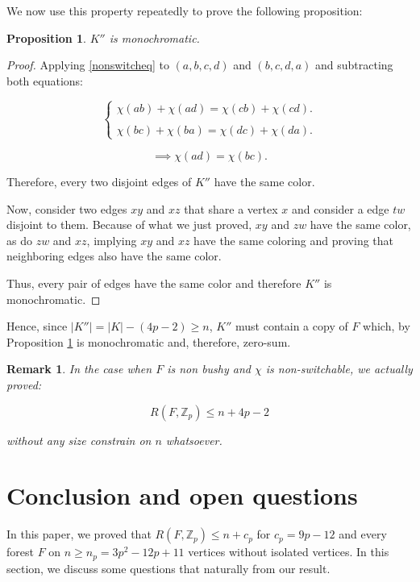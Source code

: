\documentclass{article}
\numberwithin{table}{section}
\newtheorem{prop}[theorem]{Proposition}
\newtheorem{rem}[theorem]{Remark}
\begin{document}
We now use this property repeatedly to prove the following proposition:
\begin{prop}\label{moncrochK''}
    $K''$ is monochromatic.
\end{prop}

\begin{proof}
    Applying \ref{nonswitcheq} to $(a,b,c,d)$ and $(b,c,d,a)$ and subtracting both equations:
    
$$\begin{cases}
    \chi(ab)+\chi(ad) = \chi (cb)+\chi(cd).\\\\
    \chi(bc)+\chi(ba) = \chi (dc)+\chi(da).
\end{cases}    $$
  


    $$\implies \chi(ad) = \chi(bc).$$

Therefore, every two disjoint edges of $K''$ have the same color. 

Now, consider two edges $xy$ and $xz$ that share a vertex $x$ and consider a edge $tw$ disjoint to them. Because of what we just proved, $xy$ and $zw$ have the same color, as do $zw$ and $xz$, implying $xy$ and $xz$ have the same coloring and proving that neighboring edges also have the same color.

Thus, every pair of edges have the same color and therefore $K''$ is monochromatic.
\end{proof}

Hence, since $|K''| = |K| -(4p-2) \geq n$, $K''$ must contain a copy of $F$ which, by Proposition \ref{moncrochK''} is monochromatic and, therefore, zero-sum.
\begin{rem}\label{refnbushynswitch}
    In the case when $F$ is non bushy and $\chi$ is non-switchable, we actually proved:
    
    $$R(F,\mathbb{Z}_p)\leq n+4p-2$$

    without any size constrain on $n$ whatsoever.
\end{rem}
\section{Conclusion and open questions}\label{sec : conclu}

In this paper, we proved that $R(F, \mathbb{Z}_p) \leq n + c_p$ for  $c_p=9p-12$ and every forest $F$ on $n \geq n_p=3p^2-12p+11$ vertices without isolated vertices. In this section, we discuss some questions that naturally from our result. 
\end{document}
